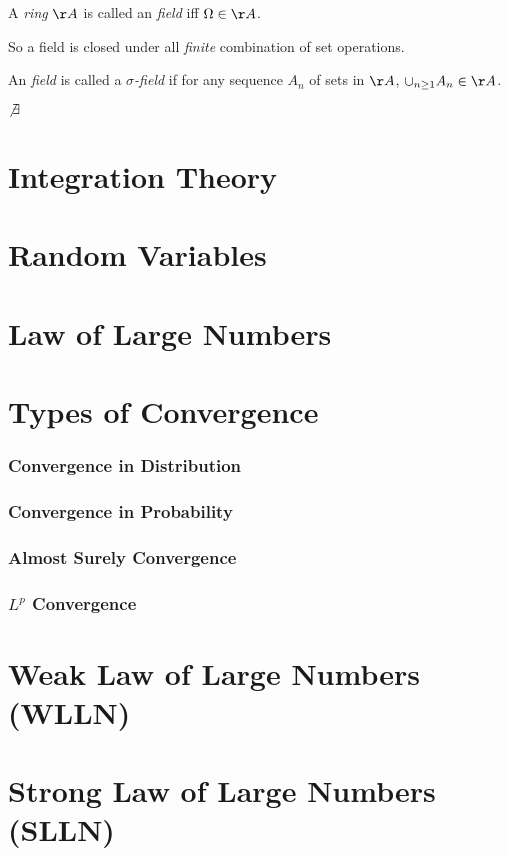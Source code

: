 \begin{deff}
	A {\em{ring}} $\AA$ is called an {\em{field}} iff $\Omega \in \AA$.
\end{deff}
So a field is closed under all {\em{finite}} combination of set operations.


\begin{deff}
	An {\em{field}} is called a {\em{$\sigma$-field}} if for any sequence ${A_n}$ of sets in $\AA$, $\cup_{n \ge 1} A_n \in \AA$.
\end{deff}

$\not \exists$

\section{Integration Theory}
\section{Random Variables}
\section{Law of Large Numbers}
\section{Types of Convergence}
\subsubsection{Convergence in Distribution}
\subsubsection{Convergence in Probability}
\subsubsection{Almost Surely Convergence}
\subsubsection{$L^p$ Convergence}

\section{Weak Law of Large Numbers (WLLN)}
\section{Strong Law of Large Numbers (SLLN)}

